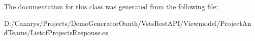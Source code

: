 The documentation for this class was generated from the following file\+:\begin{DoxyCompactItemize}
\item 
D\+:/\+Canarys/\+Projects/\+Demo\+Generator\+Oauth/\+Vsts\+Rest\+A\+P\+I/\+Viewmodel/\+Project\+And\+Teams/Listof\+Projects\+Response.\+cs\end{DoxyCompactItemize}
